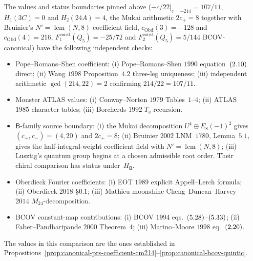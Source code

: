 \begin{remark}
\label{rem:canonical-coefficient-verification}
The values and status boundaries pinned above
\textup{(}$-c/22|_{c=-214}=107/11$, $H_1(3C)=0$ and $H_2(24A)=4$,
the Mukai arithmetic $2c_+=8$ together with Bruinier's
$N'=\operatorname{lcm}(N,8)$ coefficient field,
$c_{\mathrm{Obd}}(3)=-128$ and $c_{\mathrm{Obd}}(4)=216$,
$F_1^{\mathrm{const}}(Q_5)=-25/72$ and $F_2^{\mathrm{const}}(Q_5)=
5/144$ BCOV-canonical\textup{)} have the following independent checks:
\begin{itemize}
 \item Pope--Romans--Shen coefficient: \textup{(}i\textup{)} Pope--Romans--Shen $1990$
 equation~$\textup{(}2.10\textup{)}$ direct; \textup{(}ii\textup{)} Wang $1998$ Proposition~$4.2$
 three-leg uniqueness; \textup{(}iii\textup{)} independent arithmetic
 $\gcd(214,22)=2$ confirming $214/22=107/11$.
 \item Monster ATLAS values: \textup{(}i\textup{)} Conway--Norton $1979$
 Tables~$1$--$4$; \textup{(}ii\textup{)} ATLAS $1985$ character tables;
 \textup{(}iii\textup{)} Borcherds $1992$ $T_g$-recursion.
 \item $\mathsf B$-family source boundary: \textup{(}i\textup{)} the Mukai
 decomposition $U^4\oplus E_8(-1)^2$ gives $(c_+,c_-)=(4,20)$ and
 $2c_+=8$; \textup{(}ii\textup{)} Bruinier $2002$ LNM~$1780$,
 Lemma~$5.1$, gives the half-integral-weight coefficient field with
 $N'=\operatorname{lcm}(N,8)$; \textup{(}iii\textup{)} Lusztig's
 quantum group begins at a chosen admissible root order.  Their chiral
 comparison has status \ClaimStatusConjectured under~$H_{\mathsf B}$.
 \item Oberdieck Fourier coefficients: \textup{(}i\textup{)} EOT $1989$ explicit
 Appell--Lerch formula; \textup{(}ii\textup{)} Oberdieck $2018$ \S$0.1$;
 \textup{(}iii\textup{)} Mathieu moonshine Cheng--Duncan--Harvey $2014$
 $M_{24}$-decomposition.
 \item BCOV constant-map contributions: \textup{(}i\textup{)} BCOV $1994$
 eqs.~$\textup{(}5.28\textup{)}$--$\textup{(}5.33\textup{)}$; \textup{(}ii\textup{)} Faber--Pandharipande
 $2000$ Theorem~$4$; \textup{(}iii\textup{)} Marino--Moore $1998$
 eq.~$\textup{(}2.20\textup{)}$.
\end{itemize}
The values in this comparison are the ones established in
Propositions~\textup{\ref{prop:canonical-prs-coefficient-cm214}--\ref{prop:canonical-bcov-quintic}}.
\end{remark}
